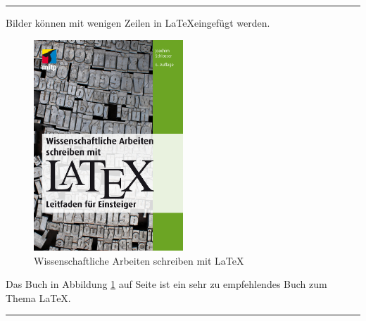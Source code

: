 
\vspace{1em}
\hrule
\vspace{1em}

Bilder können mit wenigen Zeilen in \LaTeX eingefügt werden. 

\bigskip 

\bigskip 

\begin{figure}[h!]
\centering
  \includegraphics[width=0.5\textwidth]{./bilder/LaTeX_Buch.jpg}
  \caption{Wissenschaftliche Arbeiten schreiben mit \LaTeX}
  \label{fig:schlosser}
\end{figure}


\bigskip 

Das Buch in Abbildung \ref{fig:schlosser} auf Seite \pageref{fig:schlosser} ist ein sehr zu empfehlendes Buch zum Thema \LaTeX. 

\vspace{1em}
\hrule
\vspace{1em}
